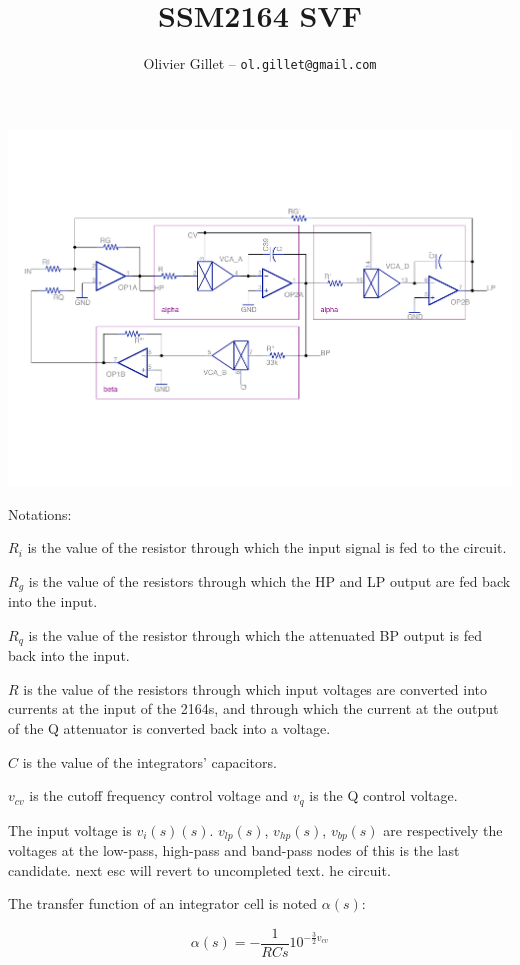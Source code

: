 \documentclass[a4paper,11pt]{article}
\title{SSM2164 SVF}
\author{Olivier Gillet -- \tt ol.gillet@gmail.com}
\date{}
\begin{document}
\maketitle

\includegraphics[width=\textwidth]{svf_schematics.pdf}


Notations:

$R_i$ is the value of the resistor through which the input signal is fed to the circuit.

$R_g$ is the value of the resistors through which the HP and LP output are fed back into the input.

$R_q$ is the value of the resistor through which the attenuated BP output is fed back into the input.

$R$ is the value of the resistors through which input voltages are converted into currents at the input of the 2164s, and through which the current at the output of the Q attenuator is converted back into a voltage.

$C$ is the value of the integrators' capacitors.

$v_{cv}$ is the cutoff frequency control voltage and $v_{q}$ is the Q control voltage.


The input voltage is $v_i(s)(s)$. $v_{lp}(s)$, $v_{hp}(s)$, $v_{bp}(s)$ are respectively the voltages at the low-pass, high-pass and band-pass nodes of this is the last candidate.  next esc will revert to uncompleted text. he circuit.

The transfer function of an integrator cell is noted $\alpha(s)$:

\begin{equation}
\alpha(s) = -\frac{1}{RCs} 10^{-\frac{3}{2} v_{cv}}
\end{equation}
\end{document}
